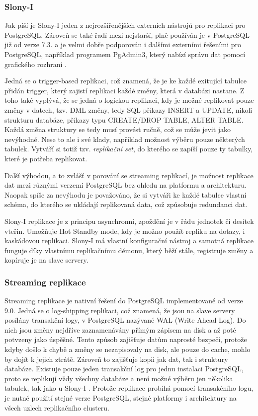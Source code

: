       \subsubsection{Slony-I}
      \label{kSlony}

      Jak píší \cite{Boszormenyi2013} je Slony-I jeden z nejrozšířenějších externích nástrojů pro replikaci pro PostgreSQL. Zároveň se také řadí mezi nejstarší, plně používán je v PostgreSQL již od verze 7.3. a je velmi dobře podporován i dalšími externími řešeními pro PostgreSQL, například programem PgAdmin3, který nabízí správu dat pomocí grafického rozhraní \citep{Boszormenyi2013}.

Jedná se o trigger-based replikaci, což znamená, že je ke každé exitující tabulce přidán trigger, který zajistí replikaci každé změny, která v databázi nastane. Z toho také vyplývá, že se jedná o logickou replikaci, kdy je možné replikovat pouze změny v datech, tzv. DML změny, tedy SQL příkazy INSERT a UPDATE, nikoli strukturu databáze, příkazy typu CREATE/DROP TABLE, ALTER TABLE. Každá změna struktury se tedy musí provést ručně, což se může jevit jako nevýhodné. Nese to ale i své klady, například možnost výběru pouze některých tabulek. Vytváří si totiž tzv. {\it replikační set}, do kterého se zapíší pouze ty tabulky, které je potřeba replikovat. 

Další výhodou, a to zvlášť v porování se streaming replikací, je možnost replikace dat mezi různými verzemi PostgreSQL bez ohledu na platformu a architekturu. Naopak spíše za nevýhodu je považováno, že si vytváři ke každé tabulce vlastní schéma, do kterého se ukládají replikovaná data, což způsobuje redundanci dat. 

Slony-I replikace je z principu asynchronní, zpoždění je v řádu jednotek či desítek vteřin. Umožňuje Hot Standby mode, kdy je možno použít repliku na dotazy, i kaskádovou replikaci. Slony-I má vlastní konfigurační nástroj a samotná replikace funguje díky vlastnímu replikačnímu démonu, který běží stále, registruje změny a kopíruje je na slave servery.

      \subsubsection{Streaming replikace}
      \label{kStreaming}

      Streaming replikace je nativní řešení do PostgreSQL implementované od verze 9.0. Jedná se o log-shipping replikaci, což znamená, že jsou na slave servery posílány transakční logy, v PostgreSQL nazývané WAL (Write Ahead Log). Do nich jsou změny nejdříve zaznamenávány přímým zápisem na disk a až poté potvzeny jako úspěšné. Tento způsob zajišťuje datům naprosté bezpečí, protože kdyby došlo k chybě a změny se nezapisovaly na disk, ale pouze do cache, mohlo by dojít k jejich ztrátě. Zároveň to zajišťuje kopii jak dat, tak i struktury databáze. Existuje pouze jeden transakční log pro jednu instalaci PostgreSQL, proto se replikují vždy všechny databáze a není možné výběru jen několika tabulek, tak jako u Slony-I \citep{Boszormenyi2013}. Protože replikace probíhá pomocí transakčního logu, je nutné použití stejné verze PostgreSQL, stejné platformy i architektury na všech uzlech replikačního clusteru. 

